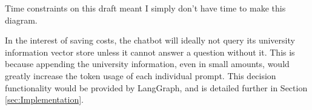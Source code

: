 \begin{tcolorbox}[colback=red!5!white,colframe=red!75!black,title=Not present in draft]
    Time constraints on this draft meant I simply don't have time to make this diagram.
\end{tcolorbox}

\noindent In the interest of saving costs, the chatbot will ideally not query its university information vector store 
unless it cannot answer a question without it. This is because appending the university information, even in small amounts, would 
greatly increase the token usage of each individual prompt. This decision functionality would be provided by LangGraph, and is detailed 
further in Section \ref{sec:Implementation}.
